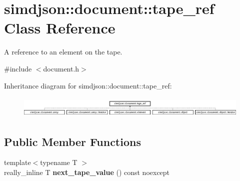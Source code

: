 \hypertarget{classsimdjson_1_1document_1_1tape__ref}{}\section{simdjson\+:\+:document\+:\+:tape\+\_\+ref Class Reference}
\label{classsimdjson_1_1document_1_1tape__ref}


A reference to an element on the tape.  




{\ttfamily \#include $<$document.\+h$>$}

Inheritance diagram for simdjson\+:\+:document\+:\+:tape\+\_\+ref\+:\begin{figure}[H]
\begin{center}
\leavevmode
\includegraphics[height=1.046729cm]{classsimdjson_1_1document_1_1tape__ref}
\end{center}
\end{figure}
\subsection*{Public Member Functions}
\begin{DoxyCompactItemize}
\item 
\mbox{\label{classsimdjson_1_1document_1_1tape__ref_a2c5785933c8e5e97e4277a2cf5303896}} 
{\footnotesize template$<$typename T $>$ }\\really\+\_\+inline T {\bfseries next\+\_\+tape\+\_\+value} () const noexcept
\end{DoxyCompactItemize}
